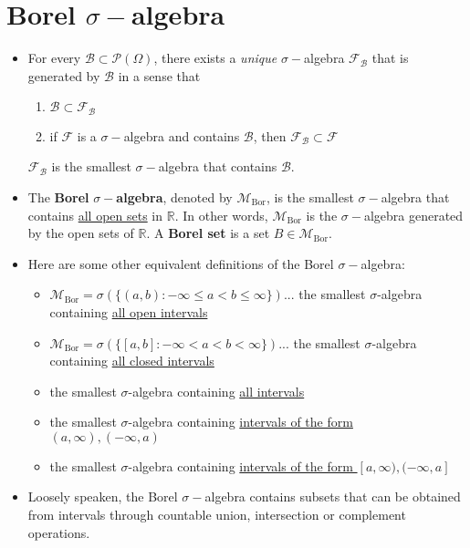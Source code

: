 \documentclass[a4paper, 11pt]{article}
\theoremstyle{plain}
\theoremstyle{definition}
\begin{document}
\section{Borel $\sigma-$algebra}
\begin{itemize}
	\item For every $\mathcal B \subset \mathcal P(\Omega)$, there exists a \emph{unique} $\sigma-$algebra $\mathcal F_{\mathcal B}$ that is generated by $\mathcal B$ in a sense that 
	\begin{enumerate}
		\item $\mathcal B \subset \mathcal F_{\mathcal B}$
		\item if $\mathcal F$ is a $\sigma-$algebra and contains $\mathcal B$, then $\mathcal F_{\mathcal B} \subset \mathcal F$
	\end{enumerate}
	$\mathcal F_{\mathcal B}$ is the smallest $\sigma-$algebra that contains $\mathcal B$.
	
	\item The \textbf{Borel} $\sigma-$\textbf{algebra}, denoted by $\mathcal M_{\mathrm{Bor}}$, is the smallest $\sigma-$algebra that contains \underline{all open sets} in $\mathbb R$. In other words, $\mathcal M_{\mathrm{Bor}}$ is the $\sigma-$algebra generated by the open sets of $\mathbb R$. A \textbf{Borel set} is a set $B \in \mathcal M_{\mathrm{Bor}}$.
	
	\item Here are some other equivalent definitions of the Borel $\sigma-$algebra:
	\begin{itemize}
		\item $\mathcal M_{\mathrm{Bor}} = \sigma(\{ (a,b) : -\infty \leq a < b \leq \infty \})$... the smallest $\sigma$-algebra containing \underline{all open intervals}
		\item $\mathcal M_{\mathrm{Bor}} = \sigma(\{ [a,b] : -\infty < a < b < \infty \})$... the smallest $\sigma$-algebra containing \underline{all closed intervals}
		\item the smallest $\sigma$-algebra containing \underline{all intervals}
		\item the smallest $\sigma$-algebra containing \underline{intervals of the form $(a, \infty), (-\infty, a)$}
		\item the smallest $\sigma$-algebra containing \underline{intervals of the form $[a, \infty), (-\infty, a]$}
	\end{itemize}

	\item Loosely speaken, the Borel $\sigma-$algebra contains subsets that can be obtained from intervals through countable union, intersection or complement operations.
	

\end{itemize}
\end{document}
